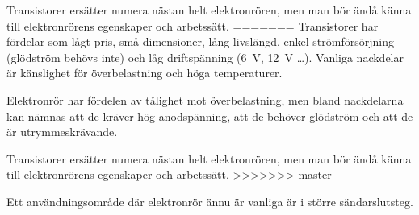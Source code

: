Transistorer ersätter numera nästan helt elektronrören, men man bör
ändå känna till elektronrörens egenskaper och arbetssätt.
=======
Transistorer har fördelar som lågt pris, små dimensioner, lång livslängd, enkel
strömförsörjning (glödström behövs inte) och låg driftspänning (6~V, 12~V
\ldots ). Vanliga nackdelar är känslighet för överbelastning och höga
temperaturer.

Elektronrör har fördelen av tålighet mot överbelastning, men bland nackdelarna
kan nämnas att de kräver hög anodspänning, att de behöver glödström och att de
är utrymmeskrävande.

Transistorer ersätter numera nästan helt elektronrören, men man bör ändå känna
till elektronrörens egenskaper och arbetssätt.
>>>>>>> master

Ett användningsområde där elektronrör ännu är vanliga är i större
sändarslutsteg.
